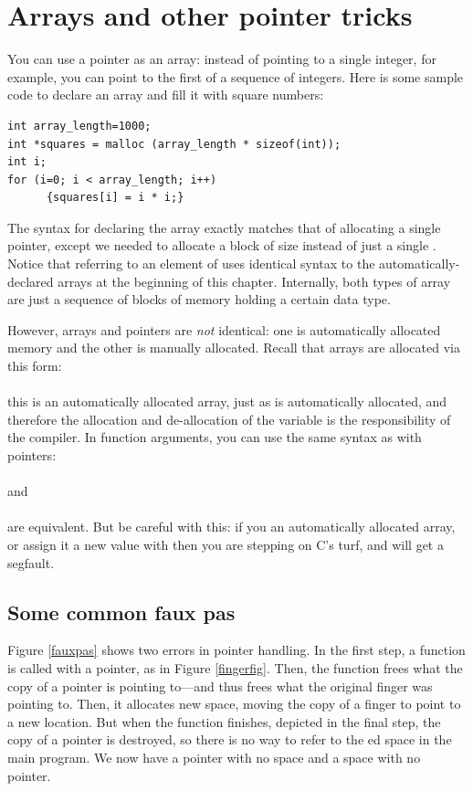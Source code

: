 \section{Arrays and other pointer tricks} \label{for_loops} 
You can use a pointer as an array: instead of pointing to a single
integer, for example, you can point to the first of a sequence of
integers. Here is some sample code to declare an array and fill it with square numbers:
\begin{lstlisting}
int array_length=1000;
int *squares = malloc (array_length * sizeof(int));
int i;
for (i=0; i < array_length; i++)
      {squares[i] = i * i;}
\end{lstlisting}

The syntax for declaring the array exactly match\-es that of allocating
a single pointer, except we need\-ed to allocate a block of size 
 instead of just a single . 
Notice that referring to an element of  uses identical syntax to the 
automatically-declared arrays at the beginning of this chapter.
Internally, both types of array are just a sequence of blocks of memory holding a certain
data type. 

However, arrays and pointers are {\em not} identical: one is
automatically allocated memory and the other is manually allocated.
Recall that arrays are allocated via this form:\\
\\
this is an automatically allocated array, just
as  is automatically allocated, and therefore
the allocation and de-allocation of the variable is the responsibility
of the compiler.  In function arguments, you can use the same
syntax as with pointers: 
\\ \\
and
\\ \\
are equivalent.
But be careful with this: if you  an automatically allocated
array, or assign it a new value with  then you are stepping
on C's turf, and will get a segfault.

\subsection{Some common faux pas} 
Figure \ref{fauxpas} shows two errors in pointer handling. In the first
step, a function is called with a pointer, as in Figure
\ref{fingerfig}. Then, the function frees what the copy of a pointer
is pointing to---and thus frees what the original finger was pointing
to. Then, it allocates new space, moving the copy of a finger to point to
a new location. But when the function finishes, depicted in the final
step, the copy of a pointer is destroyed, so there is no way to refer to
the ed space in the main program. We now have a pointer
with no space and a space with no pointer.

